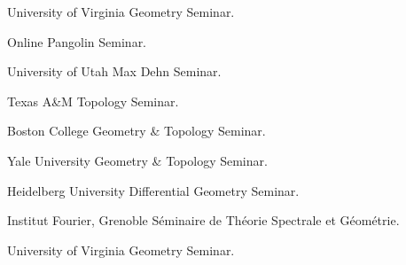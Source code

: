 {University of Virginia}
{Geometry Seminar.}
{}

{Online}
{Pangolin Seminar.}
{}

{University of Utah}
{Max Dehn Seminar.}
{}

{Texas A\&M}
{Topology Seminar.}
{}

{Boston College}
{Geometry \& Topology Seminar.}
{}

{Yale University}
{Geometry \& Topology Seminar.}
{}

{Heidelberg University}
{Differential Geometry Seminar.}
{}

{Institut Fourier, Grenoble}
{S\'eminaire de Th\'eorie Spectrale et G\'eom\'etrie.}
{}

{University of Virginia}
{Geometry Seminar.}
{}



